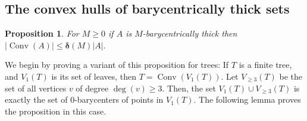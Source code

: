 \documentclass{amsart}
\numberwithin{equation}{section}
\newtheorem{proposition}[theorem]{Proposition}
\newtheorem{lemma}[theorem]{Lemma}
\theoremstyle{definition}
\newtheorem{remark}[theorem]{Remark}
\newcommand{\bdelta}{{\boldsymbol\delta}}
\DeclareMathOperator{\conv}{Conv}
\begin{document}


    

    


\subsection{The convex hulls of barycentrically thick sets}



\begin{proposition}\label{isoperimetric ineq for thick sets}
    For $M\ge 0$  if $A$ is $M$-barycentrically thick then $|\conv(A)|\le \bdelta(M) |A|.$
\end{proposition}

We begin by proving a variant of this proposition for trees: If $T$ is a finite tree, and $V_1(T)$ is its set of leaves, then $T = \conv(V_1(T))$. Let $V_{\ge 3}(T)$ be the set of all vertices $v$ of degree $\deg(v)\ge 3$.
Then, the set $V_1(T) \cup V_{\ge 3}(T)$ is exactly the set of $0$-barycenters of points in $V_1(T)$. 
The following lemma proves the proposition in this case.
\end{document}
